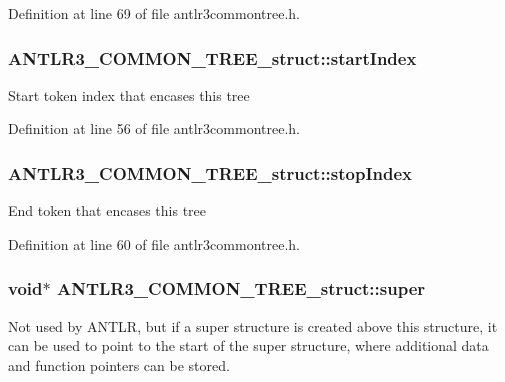Definition at line 69 of file antlr3commontree.\-h.

\hypertarget{struct_a_n_t_l_r3___c_o_m_m_o_n___t_r_e_e__struct_a2c813f62d05d88ef73b83201fd9decf6}{
\subsubsection[{start\-Index}]{ A\-N\-T\-L\-R3\-\_\-\-C\-O\-M\-M\-O\-N\-\_\-\-T\-R\-E\-E\-\_\-struct\-::start\-Index}}\label{struct_a_n_t_l_r3___c_o_m_m_o_n___t_r_e_e__struct_a2c813f62d05d88ef73b83201fd9decf6}
Start token index that encases this tree 

Definition at line 56 of file antlr3commontree.\-h.

\hypertarget{struct_a_n_t_l_r3___c_o_m_m_o_n___t_r_e_e__struct_a4747603f0393de0e6faf824e5419b789}{
\subsubsection[{stop\-Index}]{ A\-N\-T\-L\-R3\-\_\-\-C\-O\-M\-M\-O\-N\-\_\-\-T\-R\-E\-E\-\_\-struct\-::stop\-Index}}\label{struct_a_n_t_l_r3___c_o_m_m_o_n___t_r_e_e__struct_a4747603f0393de0e6faf824e5419b789}
End token that encases this tree 

Definition at line 60 of file antlr3commontree.\-h.

\hypertarget{struct_a_n_t_l_r3___c_o_m_m_o_n___t_r_e_e__struct_a7050b0be53cfd6f2aa4923becd806db5}{
\subsubsection[{super}]{\setlength{\rightskip}{0pt plus 5cm}void$\ast$ A\-N\-T\-L\-R3\-\_\-\-C\-O\-M\-M\-O\-N\-\_\-\-T\-R\-E\-E\-\_\-struct\-::super}}\label{struct_a_n_t_l_r3___c_o_m_m_o_n___t_r_e_e__struct_a7050b0be53cfd6f2aa4923becd806db5}
Not used by A\-N\-T\-L\-R, but if a super structure is created above this structure, it can be used to point to the start of the super structure, where additional data and function pointers can be stored. 

